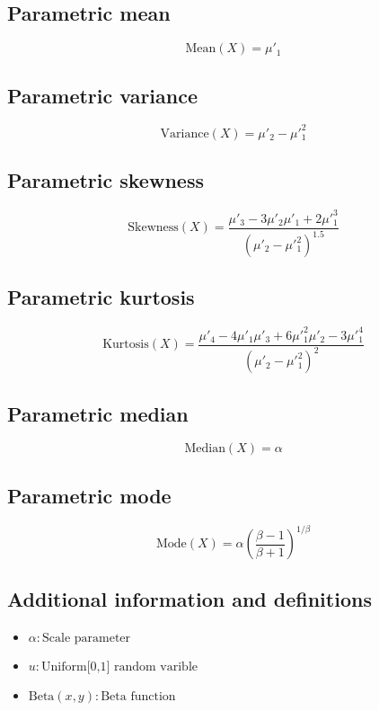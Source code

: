 \documentclass{article}
\begin{document}
\subsection{Parametric mean}
\begin{equation*} \mathrm{Mean}(X)=\mu'_{1} \end{equation*}
\subsection{Parametric variance}
\begin{equation*} \mathrm{Variance}(X)=\mu'_{2}-\mu'^{2}_{1} \end{equation*}
\subsection{Parametric skewness}
\begin{equation*} \mathrm{Skewness}(X)=\frac{\mu'_{3}-3\mu'_{2}\mu'_{1}+2\mu'^{3}_{1}}{(\mu'_{2}-\mu'^{2}_{1})^{1.5}} \end{equation*}
\subsection{Parametric kurtosis}
\begin{equation*} \mathrm{Kurtosis}(X)=\frac{\mu'_{4}-4\mu'_{1}\mu'_{3}+6\mu'^{2}_{1}\mu'_{2}-3\mu'^{4}_{1}}{(\mu'_{2}-\mu'^{2}_{1})^{2}} \end{equation*}
\subsection{Parametric median}
\begin{equation*} \mathrm{Median}(X)=\alpha \end{equation*}
\subsection{Parametric mode}
\begin{equation*} \mathrm{Mode}(X)=\alpha\left(\frac{\beta-1}{\beta+1}\right)^{1/\beta} \end{equation*}
\subsection{Additional information and definitions}
\begin{itemize}
    \item $ \alpha:\text{Scale parameter} $
    \item $ u:\text{Uniform[0,1] random varible} $
    \item $ \text{Beta}\left(x,y\right):\text{Beta function} $
\end{itemize}
\end{document}
